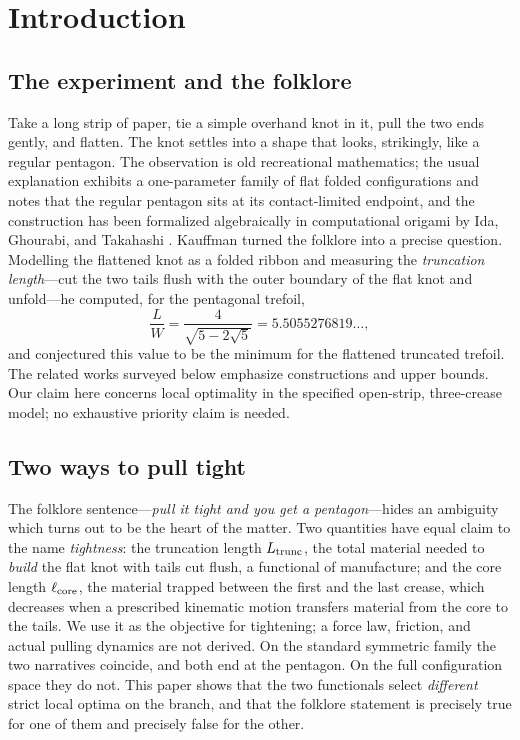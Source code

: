 \section{Introduction}\label{sec:intro}

\subsection{The experiment and the folklore}
Take a long strip of paper, tie a simple overhand knot in it, pull the two ends gently, and flatten. The knot settles into a shape that looks, strikingly, like a regular pentagon. The observation is old recreational mathematics; the usual explanation exhibits a one-parameter family of flat folded configurations and notes that the regular pentagon sits at its contact-limited endpoint, and the construction has been formalized algebraically in computational origami by Ida, Ghourabi, and Takahashi \cite{ida2015}. Kauffman \cite{kauffman2004} turned the folklore into a precise question. Modelling the flattened knot as a folded ribbon and measuring the \emph{truncation length}---cut the two tails flush with the outer boundary of the flat knot and unfold---he computed, for the pentagonal trefoil,
\begin{equation}\label{eq:kauffman-ratio}
\frac{L}{W}=\frac{4}{\sqrt{5-2\sqrt5}}=5.5055276819\ldots,
\end{equation}
and conjectured this value to be the minimum for the flattened truncated trefoil. The related works surveyed below emphasize constructions and upper bounds. Our claim here concerns local optimality in the specified open-strip, three-crease model; no exhaustive priority claim is needed.

\subsection{Two ways to pull tight}
The folklore sentence---\emph{pull it tight and you get a pentagon}---hides an ambiguity which turns out to be the heart of the matter. Two quantities have equal claim to the name \emph{tightness}:
the truncation length $L_{\mathrm{trunc}}$, the total material needed to \emph{build} the flat knot with tails cut flush, a functional of manufacture; and the core length $\ell_{\mathrm{core}}$, the material trapped between the first and the last crease, which decreases when a prescribed kinematic motion transfers material from the core to the tails. We use it as the objective for tightening; a force law, friction, and actual pulling dynamics are not derived. On the standard symmetric family the two narratives coincide, and both end at the pentagon. On the full configuration space they do not. This paper shows that the two functionals select \emph{different} strict local optima on the branch, and that the folklore statement is precisely true for one of them and precisely false for the other.

